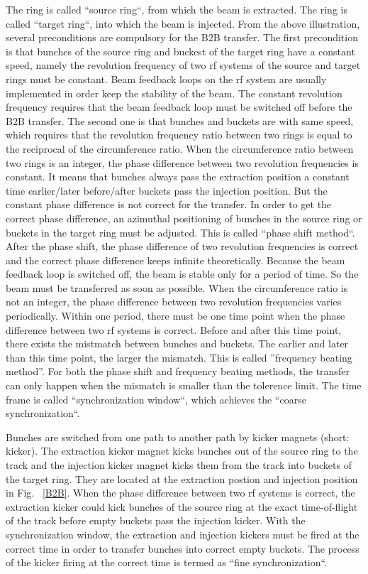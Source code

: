 The ring is called ``source ring``, from which the beam is extracted. The ring is called ``target ring``, into which the beam is injected. From the above illustration, several preconditions are compulsory for the B2B transfer. The first precondition is that bunches of the source ring and buckest of the target ring have a constant speed, namely the revolution frequency of two rf systems of the source and target rings must be constant. Beam feedback loops on the rf system are usually implemented in order keep the stability of the beam. The constant revolution frequency requires that the beam feedback loop must be switched off before the B2B transfer. The second one is that bunches and buckets are with same speed, which requires that the revolution frequency ratio between two rings is equal to the reciprocal of the circumference ratio. When the circumference ratio between two rings is an integer, the phase difference between two revolution frequencies is constant. It means that bunches always pass the extraction position a constant time earlier/later before/after buckets pass the injection position. But the constant phase difference is not correct for the transfer. In order to get the correct phase difference, an azimuthal positioning of bunches in the source ring or buckets in the target ring must be adjusted. This is called  ``phase shift method``. After the phase shift, the phase difference of two revolution frequencies is correct and the correct phase difference keeps infinite theoretically. Because the beam feedback loop is switched off, the beam is stable only for a period of time. So the beam must be transferred as soon as possible. %
When the circumference ratio is not an integer, the phase difference between two revolution frequencies varies periodically. Within one period, there must be one time point when the phase difference between two rf systems is correct. Before and after this time point, there exists the mistmatch between bunches and buckets. The earlier and later than this time point, the larger the mismatch. This is called ''frequency beating method''. For both the phase shift and frequency beating methods, the transfer can only happen when the mismatch is smaller than the tolerence limit. The time frame is called ``synchronization window``, which achieves the ``coarse synchronization``.

Bunches are switched from one path to another path by kicker magnets (short: kicker). The extraction kicker magnet kicks bunches out of the source ring to the track and the injection kicker magnet kicks them from the track into buckets of the target ring. They are located at the extraction postion and injection position in Fig. ~\ref{B2B}. When the phase difference between two rf systems is correct, the extraction kicker could kick bunches of the source ring at the exact time-of-flight of the track before empty buckets pass the injection kicker. With the synchronization window, the extraction and injection kickers must be fired at the correct time in order to transfer bunches into correct empty buckets. The process of the kicker firing at the correct time is termed as ``fine synchronization``.

